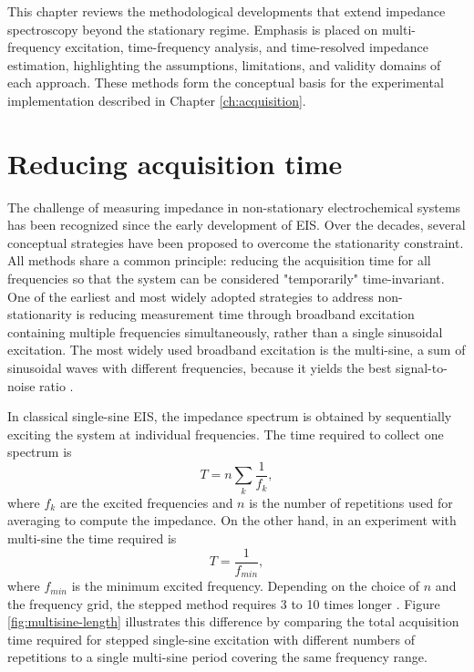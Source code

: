 This chapter reviews the methodological developments that extend impedance spectroscopy beyond the stationary regime.
Emphasis is placed on multi-frequency excitation, time-frequency analysis, and time-resolved impedance estimation, highlighting the assumptions, limitations, and validity domains of each approach.
These methods form the conceptual basis for the experimental implementation described in Chapter \ref{ch:acquisition}.

\section{Reducing acquisition time}

The challenge of measuring impedance in non-stationary electrochemical systems has been recognized since the early development of EIS.
Over the decades, several conceptual strategies have been proposed to overcome the stationarity constraint.
All methods share a common principle: reducing the acquisition time for all frequencies so that the system can be considered "temporarily" time-invariant.
One of the earliest and most widely adopted strategies to address non-stationarity is reducing measurement time through broadband excitation containing multiple frequencies simultaneously, rather than a single sinusoidal excitation.
The most widely used broadband excitation is the multi-sine, a sum of sinusoidal waves with different frequencies, because it yields the best signal-to-noise ratio \cite{creasonFourierTransformFaradaic1973a}.

In classical single-sine EIS, the impedance spectrum is obtained by sequentially exciting the system at individual frequencies. The time required to collect one spectrum is
\begin{equation}
    T = n \sum_k \frac{1}{f_k},
\end{equation}
where $f_k$ are the excited frequencies and $n$ is the number of repetitions used for averaging to compute the impedance.
On the other hand, in an experiment with multi-sine the time required is
\begin{equation}
    T = \frac{1}{f_{min}},
\end{equation}
where $f_{min}$ is the minimum excited frequency.
Depending on the choice of $n$ and the frequency grid, the stepped method requires 3 to 10 times longer \cite{schoukensBroadbandSteppedSine1999}.
Figure \ref{fig:multisine-length} illustrates this difference by comparing the total acquisition time required for stepped single-sine excitation with different numbers of repetitions to a single multi-sine period covering the same frequency range.

